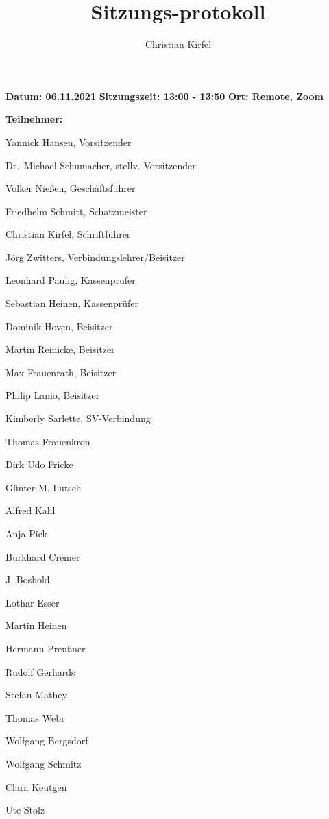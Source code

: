 \documentclass[a4paper, 11pt]{article}
\title{Sitzungs-protokoll}
\author{Christian Kirfel}
\begin{document}
\pagestyle{style1}

\textbf{Datum: 06.11.2021} %
\textbf{Sitzungszeit: 13:00 - 13:50}
\textbf{Ort: Remote, Zoom} %

\textbf{Teilnehmer:} %
\begin{description}
\item Yannick Hansen, Vorsitzender
\item Dr.~Michael Schumacher, stellv. Vorsitzender
\item Volker Nießen, Geschäftsführer
\item Friedhelm Schmitt, Schatzmeister
\item Christian Kirfel, Schriftführer
\item Jörg Zwitters, Verbindungslehrer/Beisitzer
\item Leonhard Paulig, Kassenprüfer
\item Sebastian Heinen, Kassenprüfer
\item Dominik Hoven, Beisitzer
\item Martin Reinicke, Beisitzer
\item Max Frauenrath, Beisitzer
\item Philip Lanio, Beisitzer
\item Kimberly Sarlette, SV-Verbindung
\item Thomas Frauenkron
\item Dirk Udo Fricke
\item Günter M. Lutsch
\item Alfred Kahl
\item Anja Pick
\item Burkhard Cremer
\item J. Boshold
\item Lothar Esser
\item Martin Heinen
\item Hermann Preußner
\item Rudolf Gerhards
\item Stefan Mathey
\item Thomas Webr
\item Wolfgang Bergsdorf
\item Wolfgang Schmitz
\item Clara Keutgen
\item Ute Stolz
\end{description}
\end{document}
